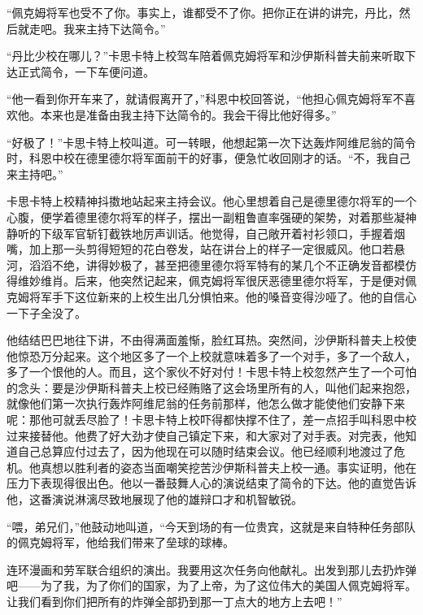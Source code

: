     “佩克姆将军也受不了你。事实上，谁都受不了你。把你正在讲的讲完，丹比，然后就走吧。我来主持下达简令。”

    “丹比少校在哪儿？”卡思卡特上校驾车陪着佩克姆将军和沙伊斯科普夫前来听取下达正式简令，一下车便问道。

    “他一看到你开车来了，就请假离开了，”科恩中校回答说，“他担心佩克姆将军不喜欢他。本来也是准备由我主持下达简令的。我会干得比他好得多。”

    “好极了！”卡思卡特上校叫道。可一转眼，他想起第一次下达轰炸阿维尼翁的简令时，科恩中校在德里德尔将军面前干的好事，便急忙收回刚才的话。“不，我自己来主持吧。”

    卡思卡特上校精神抖擞地站起来主持会议。他心里想着自己是德里德尔将军的一个心腹，便学着德里德尔将军的样子，摆出一副粗鲁直率强硬的架势，对着那些凝神静听的下级军官斩钉截铁地厉声训话。他觉得，自己敞开着衬衫领口，手握着烟嘴，加上那一头剪得短短的花白卷发，站在讲台上的样子一定很威风。他口若悬河，滔滔不绝，讲得妙极了，甚至把德里德尔将军特有的某几个不正确发音都模仿得维妙维肖。后来，他突然记起来，佩克姆将军很厌恶德里德尔将军，于是便对佩克姆将军手下这位新来的上校生出几分惧怕来。他的嗓音变得沙哑了。他的自信心一下子全没了。

    他结结巴巴地往下讲，不由得满面羞惭，脸红耳热。突然间，沙伊斯科普夫上校使他惊恐万分起来。这个地区多了一个上校就意味着多了一个对手，多了一个敌人，多了一个恨他的人。而且，这个家伙不好对付！卡思卡特上校忽然产生了一个可怕的念头：要是沙伊斯科普夫上校已经贿赂了这会场里所有的人，叫他们起来抱怨，就像他们第一次执行轰炸阿维尼翁的任务前那样，他怎么做才能使他们安静下来呢：那他可就丢尽脸了！卡思卡特上校吓得都快撑不住了，差一点招手叫科恩中校过来接替他。他费了好大劲才使自己镇定下来，和大家对了对手表。对完表，他知道自己总算应付过去了，因为他现在可以随时结束会议。他已经顺利地渡过了危机。他真想以胜利者的姿态当面嘲笑挖苦沙伊斯科普夫上校一通。事实证明，他在压力下表现得很出色。他以一番鼓舞人心的演说结束了简令的下达。他的直觉告诉他，这番演说淋漓尽致地展现了他的雄辩口才和机智敏锐。

    “喂，弟兄们，”他鼓动地叫道，“今天到场的有一位贵宾，这就是来自特种任务部队的佩克姆将军，他给我们带来了垒球的球棒。

    连环漫画和劳军联合组织的演出。我要用这次任务向他献礼。出发到那儿去扔炸弹吧——为了我，为了你们的国家，为了上帝，为了这位伟大的美国人佩克姆将军。让我们看到你们把所有的炸弹全部扔到那一丁点大的地方上去吧！”
